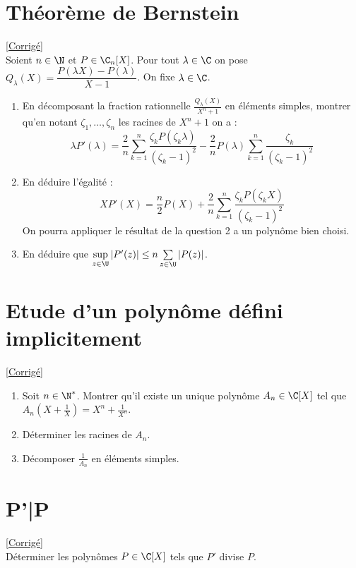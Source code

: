 \documentclass{book}
\begin{document}
	\section{Théorème de Bernstein }
	\textcolor{blue}{\hyperref[sec:theoreme-de-bernstein]{[Corrigé]}}\\
	\label{Théorème de Bernstein}
	Soient $n\in \N$ et $P\in \C_n[X]$. Pour tout $\lambda\in \C$ on pose $Q_\lambda(X)=\dfrac{P(\lambda X)-P(\lambda)}{X-1}$. On fixe $\lambda\in \C$.
	\begin{enumerate}
		\item En décomposant la fraction rationnelle $\displaystyle\frac{Q_\lambda(X)}{X^n+1}$ en éléments simples, montrer qu'en notant $\zeta_1,\dots,\zeta_n$ les racines de $X^n+1$ on a :
		$$\lambda P'(\lambda)=\displaystyle\frac{2}{n}\sum_{k=1}^n\frac{\zeta_kP(\zeta_k\lambda)}{(\zeta_k-1)^2}-\dfrac{2}{n}P(\lambda)\sum_{k=1}^n\frac{\zeta_k}{(\zeta_k-1)^2}$$
		\item En déduire l'égalité :
		$$XP'(X)=\displaystyle\frac{n}{2}P(X)+\frac{2}{n}\sum_{k=1}^n\frac{\zeta_kP(\zeta_kX)}{(\zeta_k-1)^2}$$
		On pourra appliquer le résultat de la question 2 a un polynôme bien choisi.
		\item En déduire que $\sup\limits_{z\in \U}|P'(z)|\leq n\sum\limits_{z\in \U}|P(z)|$.
	\end{enumerate}
	
	\section{Etude d'un polynôme défini implicitement}
	\textcolor{blue}{\hyperref[sec:etude-dun-polynome-defini-implicitement]{[Corrigé]}}\\
	\label{etudepolyimplicite}
	\label{Etude d'un polynôme défini implicitement}
	\begin{enumerate}
		\item Soit $n\in \N^*$. Montrer qu'il existe un unique polynôme $A_n\in \C[X]$ tel que $\displaystyle A_n\left(X+\frac{1}{X}\right)=X^n+\frac{1}{X^n}$.
		\item Déterminer les racines de $A_n$.
		\item Décomposer $\displaystyle\frac{1}{A_n}$ en éléments simples.
	\end{enumerate}
	
	\section{P'|P }
	\textcolor{blue}{\hyperref[sec:P'|P]{[Corrigé]}}\\
	\label{P'|P}
	Déterminer les polynômes $P\in \C[X]$ tels que $P'$ divise $P$.
	
\end{document}
